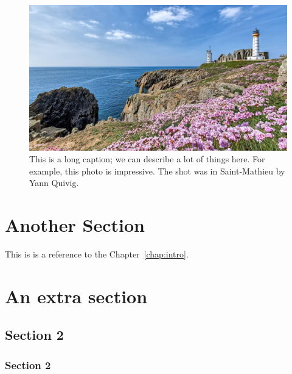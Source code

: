 \begin{figure}[tbh]
	\centering
	\includegraphics[width=0.7\linewidth]{Figures/saint_mathieu_avec_les_armeries_yann_quiviger-3215501}
	\caption[Short caption goes to List of Figures]{This is a long caption; we can describe a lot of things here. For example, this photo is impressive. The shot was in Saint-Mathieu by Yann Quivig.}
	\label{fig:test}
\end{figure}


\section{Another Section}\label{sec:another}
This is is a reference to the Chapter~\ref{chap:intro}.

\Blindtext%


\lipsum[6]

\section{An extra section}
\Blindtext%
	
\Blindtext%


\subsection{Section 2}
\Blindtext%
\subsubsection{Section 2}
\Blindtext%
